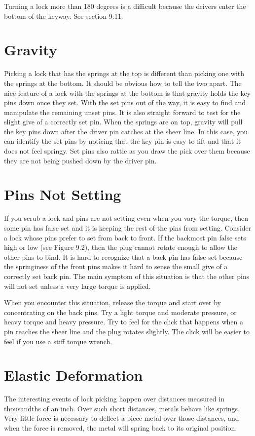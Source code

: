 Turning a lock more than 180 degrees is a difficult because the drivers enter the bottom 
of the keyway. See section 9.11.

\section{Gravity}
Picking a lock that has the springs at the top is different than picking one with the springs 
at the bottom. It should be obvious how to tell the two apart. The nice feature of a lock 
with the springs at the bottom is that gravity holds the key pins down once they set. With 
the set pins out of the way, it is easy to find and manipulate the remaining unset pins. It is 
also straight forward to test for the slight give of a correctly set pin. When the springs are 
on top, gravity will pull the key pins down after the driver pin catches at the sheer line. In 
this case, you can identify the set pins by noticing that the key pin is easy to lift and that it 
does not feel springy. Set pins also rattle as you draw the pick over them because they are 
not being pushed down by the driver pin.

\section{Pins Not Setting}
If you scrub a lock and pins are not setting even when you vary the torque, then some pin 
has false set and it is keeping the rest of the pins from setting. Consider a lock whose pins 
prefer to set from back to front. If the backmost pin false sets high or low (see Figure 9.2), 
then the plug cannot rotate enough to allow the other pins to bind. It is hard to recognize 
that a back pin has false set because the springiness of the front pins makes it hard to sense 
the small give of a correctly set back pin. The main symptom of this situation is that the 
other pins will not set unless a very large torque is applied. 

When you encounter this situation, release the torque and start over by concentrating 
on the back pins. Try a light torque and moderate pressure, or heavy torque and heavy 
pressure. Try to feel for the click that happens when a pin reaches the sheer line and the 
plug rotates slightly. The click will be easier to feel if you use a stiff torque wrench.

\section{Elastic Deformation}
The interesting events of lock picking happen over distances measured in thousandths of an 
inch. Over such short distances, metals behave like springs. Very little force is necessary to deflect a piece metal over those distances, and when the force is removed, the metal will 
spring back to its original position. 

